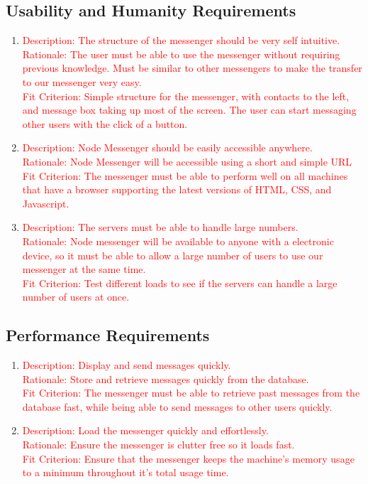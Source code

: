 \documentclass[12pt, titlepage]{article}
\begin{document}
    	\subsection{Usability and Humanity Requirements}
    	\begin{enumerate}
    	\item \textcolor{red}{Description: The structure of the messenger should be very self intuitive. \\
    		  Rationale: The user must be able to use the messenger without requiring previous knowledge. Must be similar to other messengers to make the transfer to our messenger very easy. \\
    		  Fit Criterion: Simple structure for the messenger, with contacts to the left, and message box taking up most of the screen. The user can start messaging other users with the click of a button.}
    	\item \textcolor{red}{Description: Node Messenger should be easily accessible anywhere. \\
    		  Rationale: Node Messenger will be accessible using a short and simple URL \\
    		  Fit Criterion: The messenger must be able to perform well on all machines that have a browser supporting the latest versions of HTML, CSS, and Javascript. }
    	\item \textcolor{red}{Description: The servers must be able to handle large numbers. \\
    		  Rationale: Node messenger will be available to anyone with a electronic device, so it must be able to allow a large number of users to use our messenger at the same time. \\
    		  Fit Criterion: Test different loads to see if the servers can handle a large number of users at once.}
    	\end{enumerate}
    	\subsection{Performance Requirements}
    	\begin{enumerate}
    	\item \textcolor{red}{Description: Display and send messages quickly. \\
    		  Rationale: Store and retrieve messages quickly from the database. \\
    		  Fit Criterion: The messenger must be able to retrieve past messages from the database fast, while being able to send messages to other users quickly.} 
    	\item \textcolor{red}{Description: Load the messenger quickly and effortlessly. \\
    		  Rationale: Ensure the messenger is clutter free so it loads fast. \\
    		  Fit Criterion: Ensure that the messenger keeps the machine's memory usage to a minimum throughout it's total usage time. }
    	\end{enumerate}
\end{document}
